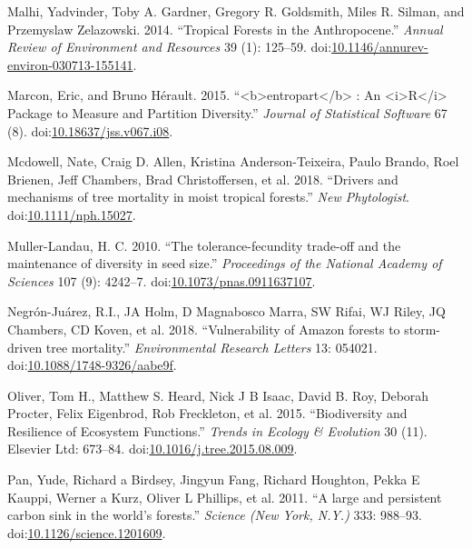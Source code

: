 \documentclass[]{elsarticle} %
\begin{document}
\hypertarget{ref-Malhi2014}{}
Malhi, Yadvinder, Toby A. Gardner, Gregory R. Goldsmith, Miles R.
Silman, and Przemyslaw Zelazowski. 2014. ``Tropical Forests in the
Anthropocene.'' \emph{Annual Review of Environment and Resources} 39
(1): 125--59.
doi:\href{https://doi.org/10.1146/annurev-environ-030713-155141}{10.1146/annurev-environ-030713-155141}.

\hypertarget{ref-Marcon2015}{}
Marcon, Eric, and Bruno Hérault. 2015.
``\textless{}b\textgreater{}entropart\textless{}/b\textgreater{} : An
\textless{}i\textgreater{}R\textless{}/i\textgreater{} Package to
Measure and Partition Diversity.'' \emph{Journal of Statistical
Software} 67 (8).
doi:\href{https://doi.org/10.18637/jss.v067.i08}{10.18637/jss.v067.i08}.

\hypertarget{ref-Mcdowell2018}{}
Mcdowell, Nate, Craig D. Allen, Kristina Anderson-Teixeira, Paulo
Brando, Roel Brienen, Jeff Chambers, Brad Christoffersen, et al. 2018.
``Drivers and mechanisms of tree mortality in moist tropical forests.''
\emph{New Phytologist}.
doi:\href{https://doi.org/10.1111/nph.15027}{10.1111/nph.15027}.

\hypertarget{ref-Muller-Landau2010}{}
Muller-Landau, H. C. 2010. ``The tolerance-fecundity trade-off and the
maintenance of diversity in seed size.'' \emph{Proceedings of the
National Academy of Sciences} 107 (9): 4242--7.
doi:\href{https://doi.org/10.1073/pnas.0911637107}{10.1073/pnas.0911637107}.

\hypertarget{ref-Negron-Juarez2018}{}
Negrón-Juárez, R.I., JA Holm, D Magnabosco Marra, SW Rifai, WJ Riley, JQ
Chambers, CD Koven, et al. 2018. ``Vulnerability of Amazon forests to
storm-driven tree mortality.'' \emph{Environmental Research Letters} 13:
054021.
doi:\href{https://doi.org/10.1088/1748-9326/aabe9f}{10.1088/1748-9326/aabe9f}.

\hypertarget{ref-Oliver2015}{}
Oliver, Tom H., Matthew S. Heard, Nick J B Isaac, David B. Roy, Deborah
Procter, Felix Eigenbrod, Rob Freckleton, et al. 2015. ``Biodiversity
and Resilience of Ecosystem Functions.'' \emph{Trends in Ecology \&
Evolution} 30 (11). Elsevier Ltd: 673--84.
doi:\href{https://doi.org/10.1016/j.tree.2015.08.009}{10.1016/j.tree.2015.08.009}.

\hypertarget{ref-Pan2011}{}
Pan, Yude, Richard a Birdsey, Jingyun Fang, Richard Houghton, Pekka E
Kauppi, Werner a Kurz, Oliver L Phillips, et al. 2011. ``A large and
persistent carbon sink in the world's forests.'' \emph{Science (New
York, N.Y.)} 333: 988--93.
doi:\href{https://doi.org/10.1126/science.1201609}{10.1126/science.1201609}.
\end{document}
